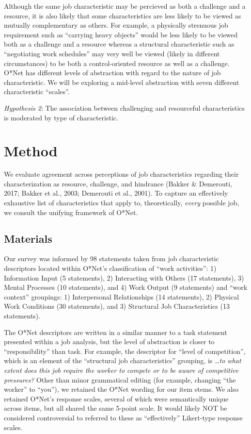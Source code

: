\documentclass[
  man]{apa6}
\begin{document}
Although the same job characteristic may be percieved as both a challenge and a resource, it is also likely that some characteristics are less likely to be viewed as mutually complementary as others. For example, a physically strenuous job requirement such as ``carrying heavy objects'' would be less likely to be viewed both as a challenge and a resource whereas a structural characteristic such as ``negotiating work schedules'' may very well be viewed (likely in different circumstances) to be both a control-oriented resource as well as a challenge. O*Net has different levels of abstraction with regard to the nature of job characteristic. We will be exploring a mid-level abstraction with seven different characteristic ``scales''.

\emph{Hypothesis 2}: The association between challenging and resourceful characteristics is moderated by type of characteristic.

\hypertarget{method}{%
\section{Method}\label{method}}

We evaluate agreement across perceptions of job characteristics regarding their characterization as resource, challenge, and hindrance (Bakker \& Demerouti, 2017; Bakker et al., 2003; Demerouti et al., 2001). To capture an effectively exhaustive list of characteristics that apply to, theoretically, \emph{every} possible job, we consult the unifying framework of O*Net.

\hypertarget{materials}{%
\subsection{Materials}\label{materials}}

Our survey was informed by 98 statements taken from job characteristic descriptors located within O*Net's classification of ``work activities'': 1) Information Input (5 statements), 2) Interacting with Others (17 statements), 3) Mental Processes (10 statements), and 4) Work Output (9 statements) and ``work context'' groupings: 1) Interpersonal Relationships (14 statements), 2) Physical Work Conditions (30 statements), and 3) Structural Job Characteristics (13 statements).

The O*Net descriptors are written in a similar manner to a task statement presented within a job analysis, but the level of abstraction is closer to ``responsibility'' than task. For example, the descriptor for ``level of competition'', which is an element of the ``structural job characteristics'' grouping, is \emph{\ldots to what extent does this job require the worker to compete or to be aware of competitive pressures?} Other than minor grammatical editing (for example, changing ``the worker'' to ``you''), we retained the O*Net wording for our item stems. We also retained O*Net's response scales, several of which were semantically unique across items, but all shared the same 5-point scale. It would likely NOT be considered controversial to referred to these as ``effectively'' Likert-type response scales.
\end{document}
